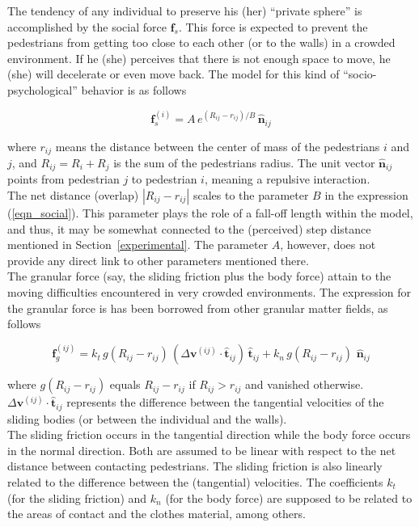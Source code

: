 \documentclass[preprint,12pt]{elsarticle}
\begin{document}
The tendency of any individual to preserve his (her) ``private sphere'' is 
accomplished by the social force $\mathbf{f}_s$. This force is expected to 
prevent the pedestrians from getting too close to each other (or to the walls) 
in a crowded environment. If he (she) perceives that there is not enough space 
to move, he (she) will decelerate or even move back. The model for this kind of 
``socio-psychological'' behavior is as follows

\begin{equation}
 \mathbf{f}_s^{(i)}=A\,e^{(R_{ij}-r_{ij})/B}\,\hat{\mathbf{n}}_{ij}
 \label{eqn_social}
\end{equation}

\noindent where $r_{ij}$ means the distance between the center of mass of the 
pedestrians $i$ and $j$, and $R_{ij}=R_i+R_j$ is the sum of the pedestrians 
radius. The unit vector $\hat{\mathbf{n}}_{ij}$ points from pedestrian $j$ to 
pedestrian $i$, meaning a repulsive interaction.\\ 

The net distance (overlap) $|R_{ij}-r_{ij}|$ scales to the parameter $B$ in the 
expression (\ref{eqn_social}). This parameter plays the role of a fall-off 
length within the model, and thus, it may be somewhat connected to the 
(perceived) step distance mentioned in Section~\ref{experimental}. The 
parameter $A$, however, does not provide any direct link to other parameters 
mentioned there. \\    

The granular force (say, the sliding friction plus the body force) attain to 
the moving difficulties encountered in very crowded environments. The 
expression for the granular force is has been borrowed from other granular 
matter fields, as follows

\begin{equation}
 \mathbf{f}_g^{(ij)}=k_t\,g(R_{ij}-r_{ij})\,
(\Delta\mathbf{v}^{(ij)}\cdot\hat{\mathbf{t}}_{ij})\,\hat{\mathbf{t}}_{ij}+
k_n\,g(R_{ij}-r_{ij})\,
\,\hat{\mathbf{n}}_{ij}\label{eqn_friction}
\end{equation}

\noindent where $g(R_{ij}-r_{ij})$ equals $R_{ij}-r_{ij}$ if $R_{ij}>r_{ij}$ and 
vanished otherwise. $\Delta\mathbf{v}^{(ij)}\cdot\hat{\mathbf{t}}_{ij}$ 
represents the difference between the tangential velocities of the sliding 
bodies (or between the individual and the walls).    \\

The sliding friction occurs in the tangential direction while the body force 
occurs in the normal direction. Both are assumed to be linear with respect to 
the net distance between contacting pedestrians. The sliding friction is also 
linearly related to the difference between the (tangential) velocities. The 
coefficients $k_t$ (for the sliding friction) and $k_n$ (for the 
body force) are supposed to be related to the areas of contact and the clothes 
material, among others. \\
\end{document}
